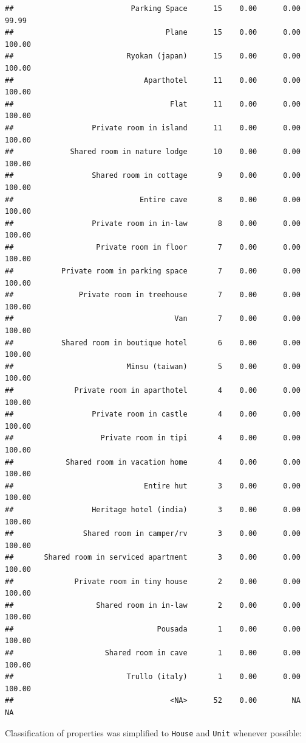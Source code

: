 \documentclass[]{article}
\begin{document}
\begin{verbatim}
##                           Parking Space      15    0.00      0.00   99.99
##                                   Plane      15    0.00      0.00  100.00
##                          Ryokan (japan)      15    0.00      0.00  100.00
##                              Aparthotel      11    0.00      0.00  100.00
##                                    Flat      11    0.00      0.00  100.00
##                  Private room in island      11    0.00      0.00  100.00
##             Shared room in nature lodge      10    0.00      0.00  100.00
##                  Shared room in cottage       9    0.00      0.00  100.00
##                             Entire cave       8    0.00      0.00  100.00
##                  Private room in in-law       8    0.00      0.00  100.00
##                   Private room in floor       7    0.00      0.00  100.00
##           Private room in parking space       7    0.00      0.00  100.00
##               Private room in treehouse       7    0.00      0.00  100.00
##                                     Van       7    0.00      0.00  100.00
##           Shared room in boutique hotel       6    0.00      0.00  100.00
##                          Minsu (taiwan)       5    0.00      0.00  100.00
##              Private room in aparthotel       4    0.00      0.00  100.00
##                  Private room in castle       4    0.00      0.00  100.00
##                    Private room in tipi       4    0.00      0.00  100.00
##            Shared room in vacation home       4    0.00      0.00  100.00
##                              Entire hut       3    0.00      0.00  100.00
##                  Heritage hotel (india)       3    0.00      0.00  100.00
##                Shared room in camper/rv       3    0.00      0.00  100.00
##       Shared room in serviced apartment       3    0.00      0.00  100.00
##              Private room in tiny house       2    0.00      0.00  100.00
##                   Shared room in in-law       2    0.00      0.00  100.00
##                                 Pousada       1    0.00      0.00  100.00
##                     Shared room in cave       1    0.00      0.00  100.00
##                          Trullo (italy)       1    0.00      0.00  100.00
##                                    <NA>      52    0.00        NA      NA
\end{verbatim}

Classification of properties was simplified to \texttt{House} and
\texttt{Unit} whenever possible:
\end{document}

